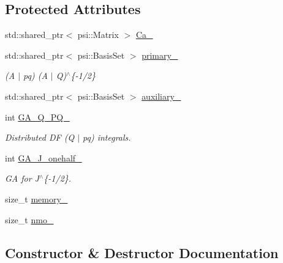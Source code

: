 \subsection*{Protected Attributes}
\begin{DoxyCompactItemize}
\item 
std\+::shared\+\_\+ptr$<$ psi\+::\+Matrix $>$ \mbox{\hyperlink{classforte_1_1_parallel_d_f_m_o_a79505e06bd3d8c932fe1f48f744806aa}{Ca\+\_\+}}
\item 
std\+::shared\+\_\+ptr$<$ psi\+::\+Basis\+Set $>$ \mbox{\hyperlink{classforte_1_1_parallel_d_f_m_o_ae125d481accd93974e190846f7397e79}{primary\+\_\+}}
\begin{DoxyCompactList}\small\item\em (A $\vert$ pq) (A $\vert$ Q)$^\wedge$\{-\/1/2\} \end{DoxyCompactList}\item 
std\+::shared\+\_\+ptr$<$ psi\+::\+Basis\+Set $>$ \mbox{\hyperlink{classforte_1_1_parallel_d_f_m_o_a2b50bed9bf7fabe0b7e0caad5a64029f}{auxiliary\+\_\+}}
\item 
int \mbox{\hyperlink{classforte_1_1_parallel_d_f_m_o_aa17c89b3602023f1a5b10f8ebe1e34eb}{G\+A\+\_\+\+Q\+\_\+\+P\+Q\+\_\+}}
\begin{DoxyCompactList}\small\item\em Distributed DF (Q $\vert$ pq) integrals. \end{DoxyCompactList}\item 
int \mbox{\hyperlink{classforte_1_1_parallel_d_f_m_o_a913dea54d2a195ce847c03d49e7dd5a8}{G\+A\+\_\+\+J\+\_\+onehalf\+\_\+}}
\begin{DoxyCompactList}\small\item\em GA for J$^\wedge$\{-\/1/2\}. \end{DoxyCompactList}\item 
size\+\_\+t \mbox{\hyperlink{classforte_1_1_parallel_d_f_m_o_a72d911652db05c267a38d87a24dc7399}{memory\+\_\+}}
\item 
size\+\_\+t \mbox{\hyperlink{classforte_1_1_parallel_d_f_m_o_a19e4a831cf05474a5b6d7ec71f618260}{nmo\+\_\+}}
\end{DoxyCompactItemize}


\subsection{Constructor \& Destructor Documentation}
\mbox{\label{classforte_1_1_parallel_d_f_m_o_a647bad30b94da4ab861517eb7fe2fbb9}} 
